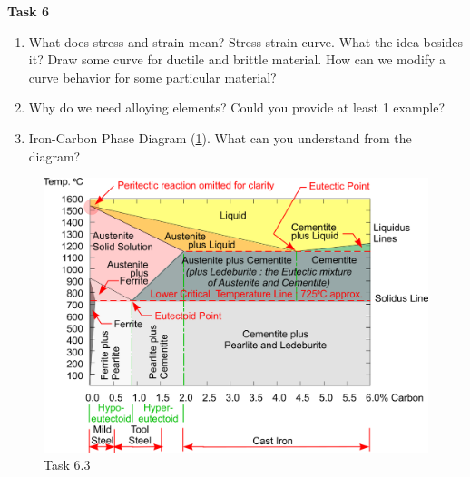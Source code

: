 \documentclass[12pt]{article}
\newcommand\pic[1]{(\cref{#1})} %
\begin{document}
\textbf{Task 6}
\begin{enumerate}
    \item What does stress and strain mean? Stress-strain curve. What the idea besides it? Draw some curve for ductile and brittle material. How can we modify a curve behavior for some particular material?
    \item Why do we need alloying elements? Could you provide at least 1 example?
    \item Iron-Carbon Phase Diagram \pic{fig:resources_quiz_1/quiz1_task6.png}. What can you understand from the diagram?
\end{enumerate}
\begin{figure}[H]
    \centering\includegraphics[height=8cm,width=1\textwidth,keepaspectratio]{resources_quiz_1/quiz1_task6.png}
    \caption{Task 6.3}
    \label{fig:resources_quiz_1/quiz1_task6.png}
\end{figure}
\end{document}
